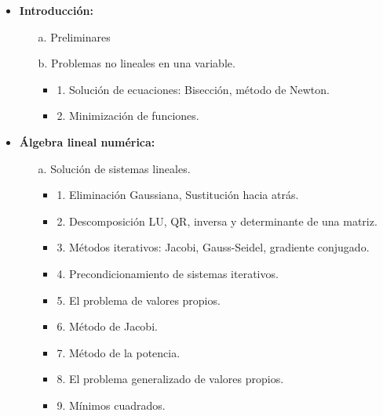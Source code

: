\documentclass[10pt,a4paper]{article}
\begin{document}
\begin{itemize}
    \item \textbf{Introducción:}
    \begin{itemize}
        \item[a.] Preliminares
        \item[b.] Problemas no lineales en una variable.
        \begin{itemize}
            \item 1. Solución de ecuaciones: Bisección, método de Newton.
            \item 2. Minimización de funciones.
        \end{itemize}
    \end{itemize}

    \item \textbf{Álgebra lineal numérica:}
    \begin{itemize}
        \item[a.] Solución de sistemas lineales.
        \begin{itemize}
            \item 1. Eliminación Gaussiana, Sustitución hacia atrás.
            \item 2. Descomposición LU, QR, inversa y determinante de una matriz.
            \item 3. Métodos iterativos: Jacobi, Gauss-Seidel, gradiente conjugado.
            \item 4. Precondicionamiento de sistemas iterativos.
            \item 5. El problema de valores propios.
            \item 6. Método de Jacobi.
            \item 7. Método de la potencia.
            \item 8. El problema generalizado de valores propios.
            \item 9. Mínimos cuadrados.
        \end{itemize}
    \end{itemize}


\end{itemize}
\end{document}
